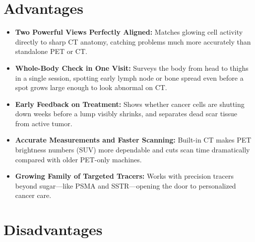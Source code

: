 \section{Advantages}

\begin{itemize}
    \item \textbf{Two Powerful Views Perfectly Aligned:} Matches glowing cell activity directly to sharp CT anatomy, catching problems much more accurately than standalone PET or CT.
    \item \textbf{Whole-Body Check in One Visit:} Surveys the body from head to thighs in a single session, spotting early lymph node or bone spread even before a spot grows large enough to look abnormal on CT.
    \item \textbf{Early Feedback on Treatment:} Shows whether cancer cells are shutting down weeks before a lump visibly shrinks, and separates dead scar tissue from active tumor.
    \item \textbf{Accurate Measurements and Faster Scanning:} Built-in CT makes PET brightness numbers (SUV) more dependable and cuts scan time dramatically compared with older PET-only machines.
    \item \textbf{Growing Family of Targeted Tracers:} Works with precision tracers beyond sugar---like PSMA and SSTR---opening the door to personalized cancer care.
\end{itemize}

\section{Disadvantages}

